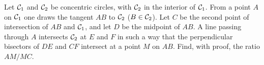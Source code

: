 Let ${\cal C}_1$ and ${\cal C}_2$ be  concentric circles, with ${\cal C}_2$ in the interior of  ${\cal C}_1$. From a point $A$ on ${\cal C}_1$ one draws the tangent $AB$ to ${\cal C}_2$ ($B\in {\cal C}_2$). Let $C$ be the second point of intersection of $AB$ and ${\cal C}_1$,  and let $D$ be the midpoint of $AB$. A line passing through $A$ intersects ${\cal C}_2$ at $E$ and $F$ in such a way that the perpendicular  bisectors of $DE$ and $CF$ intersect at a point $M$ on $AB$. Find, with proof,  the ratio $AM/MC$.